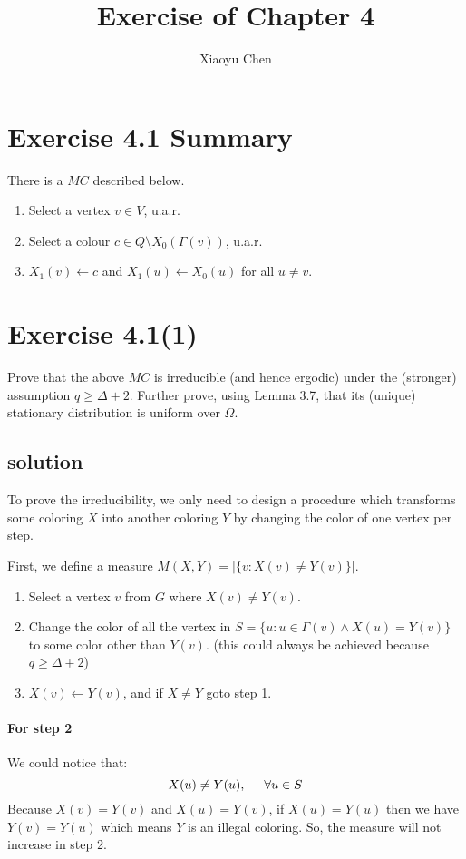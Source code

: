 \documentclass{article}
\title{Exercise of Chapter 4}
\author{Xiaoyu Chen}
\date{}
\begin{document}
\maketitle

\section{Exercise 4.1 Summary}
There is a $MC$ described below.
\begin{enumerate}[itemsep=0mm]
\item Select a vertex $v \in V$, u.a.r.
\item Select a colour $c \in Q \setminus X_0(\Gamma(v))$, u.a.r.
\item $X_1(v)\gets c$ and $X_1(u)\gets X_0(u)$ for all $u\not=v$.
\end{enumerate}
\section{Exercise 4.1(1)}
Prove that the above $MC$ is irreducible (and hence ergodic) under the (stronger) assumption $q \geq \Delta + 2$. Further prove, using Lemma 3.7, that its (unique) stationary distribution is uniform over $\Omega$.
\subsection{solution}
To prove the irreducibility, we only need to design a procedure which transforms some coloring $X$ into another coloring $Y$ by changing the color of one vertex per step.

First, we define a measure $M(X, Y) = |\{v: X(v) \not= Y(v)\}|$.
\begin{tcolorbox}[title=The Procedure]
 \begin{enumerate}[itemsep=0mm]
  \item Select a vertex $v$ from $G$ where $X(v) \not= Y(v)$.
  \item Change the color of all the vertex in $S = \{u: u\in\Gamma(v)\land X(u) = Y(v)\}$ to some color other than $Y(v)$. (this could always be achieved because $q \geq \Delta + 2$)
  \item $X(v) \gets Y(v)$, and if $X \not= Y$ goto step 1.
  \end{enumerate}
\end{tcolorbox}
\paragraph{For step 2} We could notice that:
\[
  X(u) \not= Y(u),\hspace{0.5cm} \forall u\in S
\]
Because $X(v) = Y(v)$ and $X(u) = Y(v)$, if $X(u) = Y(u)$ then we have $Y(v) = Y(u)$ which means $Y$ is an illegal coloring.
So, the measure will not increase in step 2.
\end{document}
